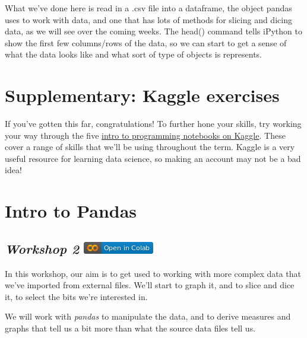 \documentclass[
  letterpaper,
  DIV=11,
  numbers=noendperiod]{scrreprt}
\begin{document}
What we've done here is read in a .csv file into a dataframe, the object
pandas uses to work with data, and one that has lots of methods for
slicing and dicing data, as we will see over the coming weeks. The
head() command tells iPython to show the first few columns/rows of the
data, so we can start to get a sense of what the data looks like and
what sort of type of objects is represents.


\hypertarget{supplementary-kaggle-exercises}{%
\chapter{Supplementary: Kaggle
exercises}\label{supplementary-kaggle-exercises}}

If you've gotten this far, congratulations! To further hone your skills,
try working your way through the five
\href{https://www.kaggle.com/learn/intro-to-programming}{intro to
programming notebooks on Kaggle}. These cover a range of skills that
we'll be using throughout the term. Kaggle is a very useful resource for
learning data science, so making an account may not be a bad idea!


\hypertarget{intro-to-pandas}{%
\chapter{Intro to Pandas}\label{intro-to-pandas}}

\hypertarget{workshop-2-open-in-colab}{%
\section[\emph{Workshop 2} ]{\texorpdfstring{\emph{Workshop 2}
\href{https://colab.research.google.com/github/oballinger/QM2/blob/main/notebooks/W03.\%20Spatial\%20Data.ipynb}{\protect\includegraphics{notebooks/../colab-badge.png}}}{Workshop 2 Open In Colab}}\label{workshop-2-open-in-colab}}

In this workshop, our aim is to get used to working with more complex
data that we've imported from external files. We'll start to graph it,
and to slice and dice it, to select the bits we're interested in.

We will work with \emph{pandas} to manipulate the data, and to derive
measures and graphs that tell us a bit more than what the source data
files tell us.
\end{document}
